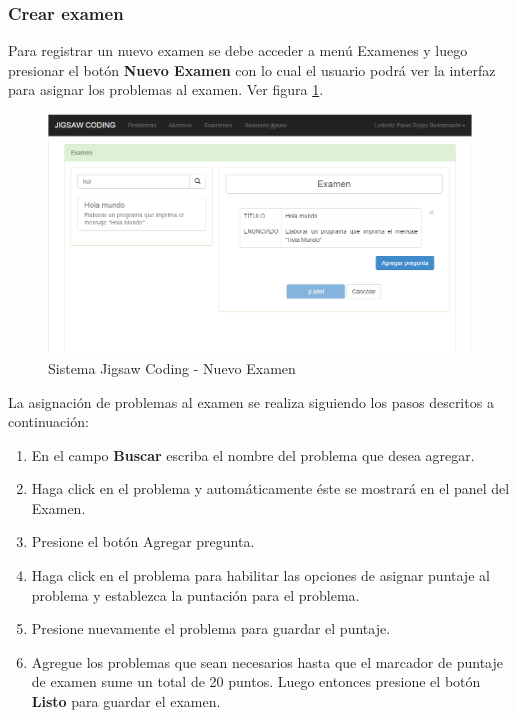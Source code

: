 \subsubsection{Crear examen}

Para registrar un nuevo examen se debe acceder a menú Examenes y luego presionar el botón \textbf{Nuevo Examen} con lo cual el usuario podrá ver la interfaz para asignar los problemas al examen. Ver figura \ref{fig:examenes_nuevo}. \\

\begin{figure}[h!]
	\centering
	\caption[SJC Nuevo examen]{Sistema Jigsaw Coding - Nuevo Examen}
	\label{fig:examenes_nuevo}
	\includegraphics[scale=0.5]{figuras/usodelsistema/docente/examenes_nuevo}
\end{figure}

La asignación de problemas al examen se realiza siguiendo los pasos descritos a continuación:

\begin{enumerate}
	\item En el campo \textbf{Buscar} escriba el nombre del problema que desea agregar.
	\item Haga click en el problema y automáticamente éste se mostrará en el panel del Examen.
	\item Presione el botón Agregar pregunta.
	\item Haga click en el problema para habilitar las opciones de asignar puntaje al problema y establezca la puntación para el problema. 
	\item Presione nuevamente el problema para guardar el puntaje.
	\item Agregue los problemas que sean necesarios hasta que el marcador de puntaje de examen sume un total de 20 puntos. Luego entonces presione el botón \textbf{Listo} para guardar el examen.
\end{enumerate}

